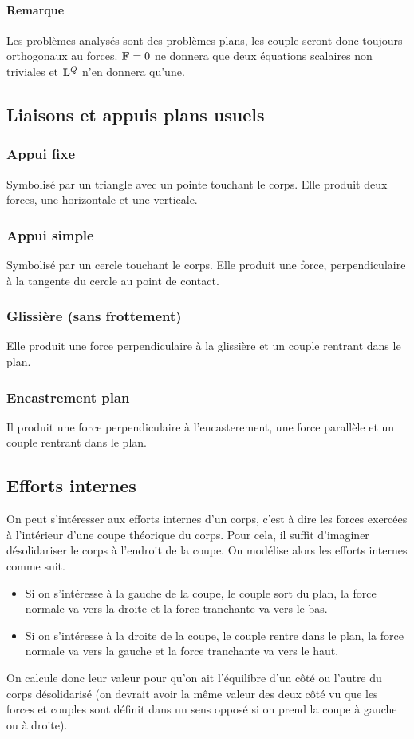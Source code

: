\paragraph{Remarque}
Les problèmes analysés sont des problèmes plans, les couple seront donc toujours orthogonaux au forces.
${\bf F} = 0$ ne donnera que deux équations scalaires non triviales et ${\bf L}^Q$ n'en donnera qu'une.

\subsection{Liaisons et appuis plans usuels}
\subsubsection{Appui fixe}
Symbolisé par un triangle avec un pointe touchant le corps.
Elle produit deux forces, une horizontale et une verticale.

\subsubsection{Appui simple}
Symbolisé par un cercle touchant le corps.
Elle produit une force, perpendiculaire à la tangente du cercle au point de contact.

\subsubsection{Glissière (sans frottement)}
Elle produit une force perpendiculaire à la glissière et un couple rentrant dans le plan.

\subsubsection{Encastrement plan}
Il produit une force perpendiculaire à l'encasterement, une force parallèle et un couple rentrant dans le plan.

\subsection{Efforts internes}
On peut s'intéresser aux efforts internes d'un corps, c'est à dire les forces exercées à l'intérieur d'une coupe théorique du corps.
Pour cela, il suffit d'imaginer désolidariser le corps à l'endroit de la coupe.
On modélise alors les efforts internes comme suit.
\begin{itemize}
	\item Si on s'intéresse à la gauche de la coupe, le couple sort du plan, la force normale va vers la droite et la force tranchante va vers le bas.
	\item Si on s'intéresse à la droite de la coupe, le couple rentre dans le plan, la force normale va vers la gauche et la force tranchante va vers le haut.
\end{itemize}
On calcule donc leur valeur pour qu'on ait l'équilibre d'un côté ou l'autre du corps désolidarisé (on devrait avoir la même valeur des deux côté vu que les forces et couples sont définit dans un sens opposé si on prend la coupe à gauche ou à droite).

